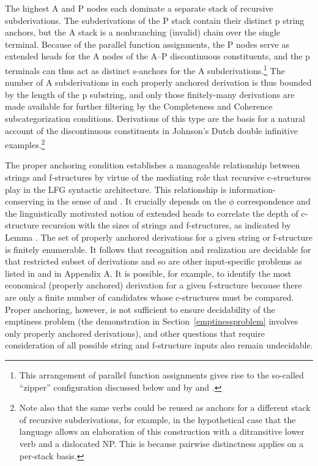 \documentclass[output=paper,hidelinks]{langscibook}
\begin{document}
\noindent  The highest A and P nodes each dominate a separate stack of recursive subderivations. The subderivations of the P stack contain their distinct p string anchors, but the A stack is a nonbranching (invalid) chain over the single terminal.  Because of the parallel  function assignments, the P nodes serve as extended heads for the A nodes of the A--P discontinuous constituents, and the p terminals can thus act as distinct s-anchors for the A subderivations.\footnote{This arrangement of parallel function assignments gives rise to the so-called ``zipper'' configuration discussed below and by \citet{maxwellkaplan96} and \citet{KaplanWedekind2020:Zipper}.}  The number of A subderivations in each properly anchored derivation is thus bounded by the length of the p substring, and only those finitely-many derivations are made available for further filtering by the Completeness and Coherence subcategorization conditions.  Derivations of this type are the basis for a natural account of the discontinuous constituents in Johnson's \citeyearpar{Johnson1986}  Dutch double infinitive examples.\footnote{\label{multiplestacks}Note also that the same verbs could be reused as anchors for a different stack of recursive subderivations, for example, in the hypothetical case that the language allows an elaboration of this construction with a ditransitive lower verb and a dislocated  NP. This is because pairwise distinctness  applies on a per-stack basis.}

The proper anchoring condition   establishes a manageable relationship between strings and f-structures by virtue of the mediating role that recursive c-structures play in the LFG syntactic architecture.  This relationship is information-conserving in the sense of  and . It crucially depends on the $\phi$ correspondence and the linguistically motivated notion of extended heads to correlate the depth of c-structure recursion with the sizes of strings and f-structures, as indicated by Lemma  .  The set of properly anchored derivations for a given string or f-structure is finitely enumerable. It follows that recognition and realization are decidable for that restricted subset of derivations and so are other input-specific problems as listed in  and in Appendix A. It is possible, for example, to identify the most economical (properly anchored) derivation for a given f-structure because there are only a finite number of candidates whose c-structures must be compared. Proper anchoring, however, is not sufficient to ensure decidability of the emptiness problem (the demonstration in Section~\ref{emptinessproblem} involves only properly anchored derivations), and other questions that require consideration of all possible string and f-structure inputs also remain undecidable.
\end{document}
